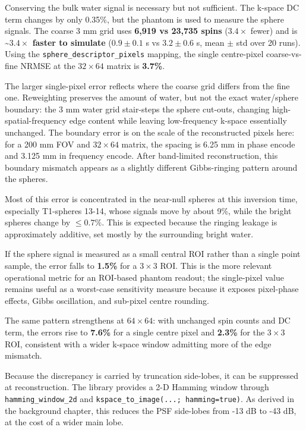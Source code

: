 Conserving the bulk water signal is necessary but not sufficient. The
k-space DC term changes by only 0.35\%, but the phantom is used to
measure the sphere signals. The coarse 3 mm grid uses
\textbf{6,919 vs 23,735 spins} (\(3.4\times\) fewer) and is
\textbf{\textasciitilde\(3.4\times\) faster to simulate}
(\(0.9 \pm 0.1\) s vs \(3.2 \pm 0.6\) s, mean \(\pm\) std over 20
runs). Using the \texttt{sphere\_descriptor\_pixels} mapping, the single
centre-pixel coarse-vs-fine NRMSE at the \(32\times64\) matrix is \textbf{3.7\%}.

The larger single-pixel error reflects where the coarse grid differs
from the fine one. Reweighting preserves the amount of water, but not
the exact water/sphere boundary: the 3 mm water grid stair-steps the
sphere cut-outs, changing high-spatial-frequency edge content while
leaving low-frequency k-space essentially unchanged. The boundary error
is on the scale of the reconstructed pixels here: for a 200 mm FOV and
\(32\times64\) matrix, the spacing is 6.25 mm in phase encode and 3.125 mm in
frequency encode. After band-limited reconstruction, this boundary
mismatch appears as a slightly different Gibbs-ringing pattern around
the spheres.

Most of this error is concentrated in the near-null spheres at this
inversion time, especially T1-spheres 13-14, whose signals move by about
9\%, while the bright spheres change by \(\leq 0.7\%\). This is expected because
the ringing leakage is approximately additive, set mostly by the
surrounding bright water.

If the sphere signal is measured as a small central ROI rather than a
single point sample, the error falls to \textbf{1.5\%} for a \(3\times3\) ROI.
This is the more relevant operational metric for an ROI-based phantom
readout; the single-pixel value remains useful as a worst-case
sensitivity measure because it exposes pixel-phase effects, Gibbs
oscillation, and sub-pixel centre rounding.

The same pattern strengthens at \(64\times64\): with unchanged spin counts and DC
term, the errors rise to \textbf{7.6\%} for a single centre pixel and
\textbf{2.3\%} for the \(3\times3\) ROI, consistent with a wider k-space window
admitting more of the edge mismatch.

Because the discrepancy is carried by truncation side-lobes, it can be
suppressed at reconstruction. The library provides a 2-D Hamming window
through \texttt{hamming\_\allowbreak window\_\allowbreak 2d} and
\texttt{kspace\_\allowbreak to\_\allowbreak image(...;\ hamming=true)}. As derived in the
background chapter, this reduces the PSF side-lobes from -13 dB to -43
dB, at the cost of a wider main lobe.

